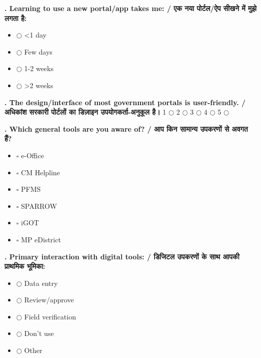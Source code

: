 \documentclass[11pt,a4paper]{article}
\newcounter{qcounter}
\begin{document}
\textbf{. Learning to use a new portal/app takes me: / एक नया पोर्टल/ऐप सीखने में मुझे लगता है:}
\vspace{0.1cm}
\begin{itemize}[label=, itemsep=0.1cm, leftmargin=0.5cm]
    \item $\bigcirc$ <1 day
    \item $\bigcirc$ Few days
    \item $\bigcirc$ 1-2 weeks
    \item $\bigcirc$ >2 weeks
\end{itemize}
\vspace{0.2cm}

\textbf{. The design/interface of most government portals is user-friendly. / अधिकांश सरकारी पोर्टलों का डिज़ाइन उपयोगकर्ता-अनुकूल है।}
\vspace{0.1cm}
\vspace{0.1cm}
1 $\bigcirc$ \hspace{1cm} 2 $\bigcirc$ \hspace{1cm} 3 $\bigcirc$ \hspace{1cm} 4 $\bigcirc$ \hspace{1cm} 5 $\bigcirc$
\vspace{0.4cm}

\textbf{. Which general tools are you aware of? / आप किन सामान्य उपकरणों से अवगत हैं?}
\vspace{0.1cm}
\begin{itemize}[label=, itemsep=0.1cm, leftmargin=0.5cm]
    \item $\square$ e-Office
    \item $\square$ CM Helpline
    \item $\square$ PFMS
    \item $\square$ SPARROW
    \item $\square$ iGOT
    \item $\square$ MP eDistrict
\end{itemize}
\vspace{0.2cm}

\textbf{. Primary interaction with digital tools: / डिजिटल उपकरणों के साथ आपकी प्राथमिक भूमिका:}
\vspace{0.1cm}
\begin{itemize}[label=, itemsep=0.1cm, leftmargin=0.5cm]
    \item $\bigcirc$ Data entry
    \item $\bigcirc$ Review/approve
    \item $\bigcirc$ Field verification
    \item $\bigcirc$ Don't use
    \item $\bigcirc$ Other
\end{itemize}
\vspace{0.2cm}
\end{document}
